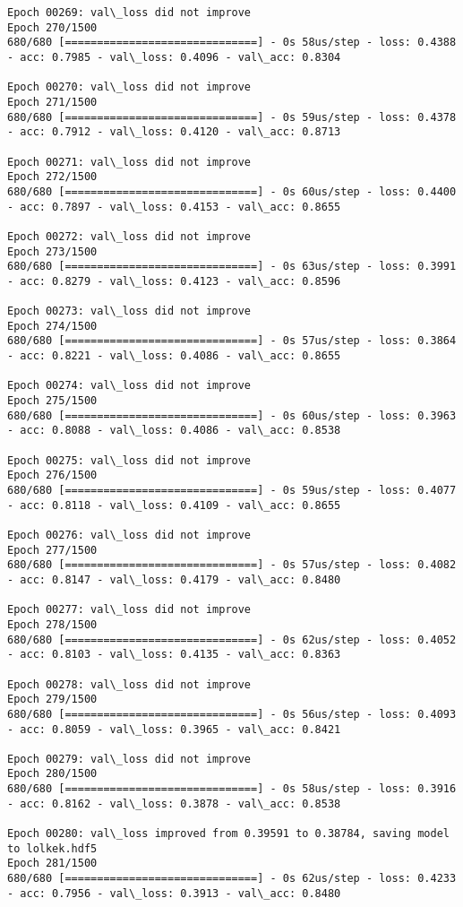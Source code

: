 \documentclass[11pt]{article}
\begin{document}
\begin{Verbatim}[commandchars=\\\{\}]
Epoch 00269: val\_loss did not improve
Epoch 270/1500
680/680 [==============================] - 0s 58us/step - loss: 0.4388 - acc: 0.7985 - val\_loss: 0.4096 - val\_acc: 0.8304

Epoch 00270: val\_loss did not improve
Epoch 271/1500
680/680 [==============================] - 0s 59us/step - loss: 0.4378 - acc: 0.7912 - val\_loss: 0.4120 - val\_acc: 0.8713

Epoch 00271: val\_loss did not improve
Epoch 272/1500
680/680 [==============================] - 0s 60us/step - loss: 0.4400 - acc: 0.7897 - val\_loss: 0.4153 - val\_acc: 0.8655

Epoch 00272: val\_loss did not improve
Epoch 273/1500
680/680 [==============================] - 0s 63us/step - loss: 0.3991 - acc: 0.8279 - val\_loss: 0.4123 - val\_acc: 0.8596

Epoch 00273: val\_loss did not improve
Epoch 274/1500
680/680 [==============================] - 0s 57us/step - loss: 0.3864 - acc: 0.8221 - val\_loss: 0.4086 - val\_acc: 0.8655

Epoch 00274: val\_loss did not improve
Epoch 275/1500
680/680 [==============================] - 0s 60us/step - loss: 0.3963 - acc: 0.8088 - val\_loss: 0.4086 - val\_acc: 0.8538

Epoch 00275: val\_loss did not improve
Epoch 276/1500
680/680 [==============================] - 0s 59us/step - loss: 0.4077 - acc: 0.8118 - val\_loss: 0.4109 - val\_acc: 0.8655

Epoch 00276: val\_loss did not improve
Epoch 277/1500
680/680 [==============================] - 0s 57us/step - loss: 0.4082 - acc: 0.8147 - val\_loss: 0.4179 - val\_acc: 0.8480

Epoch 00277: val\_loss did not improve
Epoch 278/1500
680/680 [==============================] - 0s 62us/step - loss: 0.4052 - acc: 0.8103 - val\_loss: 0.4135 - val\_acc: 0.8363

Epoch 00278: val\_loss did not improve
Epoch 279/1500
680/680 [==============================] - 0s 56us/step - loss: 0.4093 - acc: 0.8059 - val\_loss: 0.3965 - val\_acc: 0.8421

Epoch 00279: val\_loss did not improve
Epoch 280/1500
680/680 [==============================] - 0s 58us/step - loss: 0.3916 - acc: 0.8162 - val\_loss: 0.3878 - val\_acc: 0.8538

Epoch 00280: val\_loss improved from 0.39591 to 0.38784, saving model to lolkek.hdf5
Epoch 281/1500
680/680 [==============================] - 0s 62us/step - loss: 0.4233 - acc: 0.7956 - val\_loss: 0.3913 - val\_acc: 0.8480


\end{Verbatim}
\end{document}
